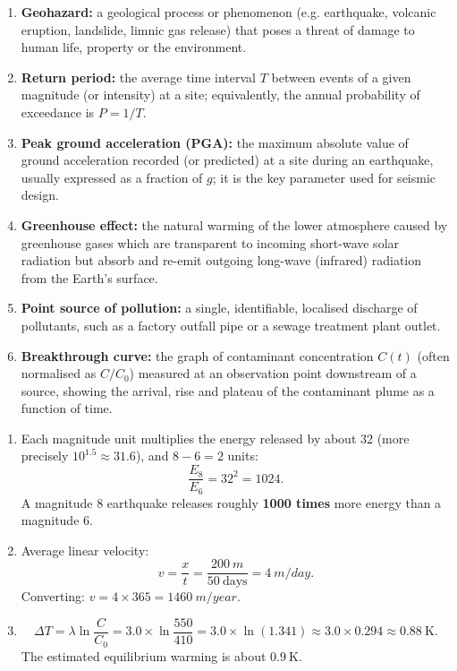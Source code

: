 \documentclass[11pt]{article}
\begin{document}
\begin{corrige}
\begin{enumerate}
\item \textbf{Geohazard:} a geological process or phenomenon (e.g. earthquake, volcanic eruption, landslide, limnic gas release) that poses a threat of damage to human life, property or the environment.
\item \textbf{Return period:} the average time interval $T$ between events of a given magnitude (or intensity) at a site; equivalently, the annual probability of exceedance is $P = 1/T$.
\item \textbf{Peak ground acceleration (PGA):} the maximum absolute value of ground acceleration recorded (or predicted) at a site during an earthquake, usually expressed as a fraction of $g$; it is the key parameter used for seismic design.
\item \textbf{Greenhouse effect:} the natural warming of the lower atmosphere caused by greenhouse gases which are transparent to incoming short-wave solar radiation but absorb and re-emit outgoing long-wave (infrared) radiation from the Earth's surface.
\item \textbf{Point source of pollution:} a single, identifiable, localised discharge of pollutants, such as a factory outfall pipe or a sewage treatment plant outlet.
\item \textbf{Breakthrough curve:} the graph of contaminant concentration $C(t)$ (often normalised as $C/C_0$) measured at an observation point downstream of a source, showing the arrival, rise and plateau of the contaminant plume as a function of time.
\end{enumerate}
\end{corrige}

\begin{corrige}
\begin{enumerate}
\item Each magnitude unit multiplies the energy released by about 32 (more precisely $10^{1.5} \approx 31.6$), and $8 - 6 = 2$ units:
\[ \frac{E_8}{E_6} = 32^{2} = 1024. \]
A magnitude 8 earthquake releases roughly \textbf{1000 times} more energy than a magnitude 6.
\item Average linear velocity:
\[ v = \frac{x}{t} = \frac{\SI{200}{m}}{50\ \text{days}} = \SI{4}{m/day}. \]
Converting: $v = 4 \times 365 = \SI{1460}{m/year}$.
\item 
\[ \Delta T = \lambda \ln\frac{C}{C_0} = 3.0 \times \ln\frac{550}{410} = 3.0 \times \ln(1.341) \approx 3.0 \times 0.294 \approx \SI{0.88}{\kelvin}. \]
The estimated equilibrium warming is about $\SI{0.9}{\kelvin}$.
\end{enumerate}
\end{corrige}
\end{document}
